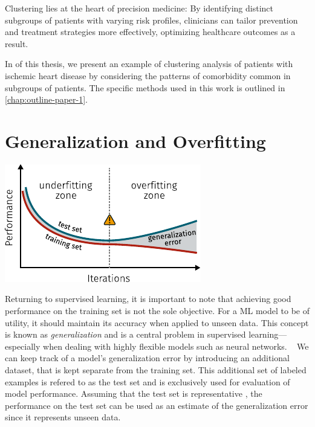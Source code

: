 Clustering lies at the heart of precision medicine:
By identifying distinct subgroups of patients with varying risk profiles, 
clinicians can tailor prevention and treatment strategies more effectively, 
optimizing healthcare outcomes as a result.

In  of this thesis,
we present an example of clustering analysis of patients with 
ischemic heart disease by considering the patterns of comorbidity 
common in subgroups of patients.
The specific methods used in this work is outlined 
in \cref{chap:outline-paper-1}.

\section{Generalization and Overfitting}
\label{overfitting}

\begin{marginfigure}[3em]
    \centering
	\includegraphics{graphics/overfitting-2}
    \caption[Overfitting as Function of Number of Epochs]{%
        Training a neural network model for many iterations 
        runs the risk of overfitting the model to the training data.
        Although the training error keeps decreasing, 
        it happens at the expense of increased generalization error.
        Inspired by \cite{goodfellow2016deep}.
    }
    \label{fig:generalization-error}
\end{marginfigure}

Returning to supervised learning,
it is important to note that achieving good performance on the 
training set is not the sole objective.
For a \ac{ML} model to be of utility, 
it should maintain its accuracy
when applied to unseen data.
This concept is known as \textit{generalization} and
is a central problem in supervised learning---%
especially when dealing with highly flexible models 
such as neural networks.
~\autocite{goodfellow2016deep}
We can keep track of a model's generalization error 
by introducing an additional dataset, 
that is kept separate from the training set. 
This additional set of labeled examples is refered to as the test set
and is exclusively used for evaluation of model performance.
Assuming that the test set is representative%
\sidenote{%
    An underlying assumption is that the two datasets are 
    independent and identically distributed 
    (typically abbreviated as i.i.d.),
    and thus share the same underlying \textit{data-generating process}.
    [\cite{goodfellow2016deep}]
},
the performance on the test set can be used as an estimate of 
the generalization error since it represents unseen data.


